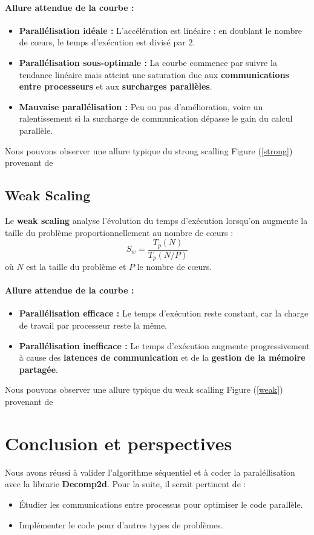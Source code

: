 \documentclass[a4paper,12pt]{article}
\begin{document}
\paragraph{Allure attendue de la courbe :}  
\begin{itemize}
    \item \textbf{Parallélisation idéale :} L’accélération est linéaire : en doublant le nombre de cœurs, le temps d’exécution est divisé par 2.
    \item \textbf{Parallélisation sous-optimale :} La courbe commence par suivre la tendance linéaire mais atteint une saturation due aux \textbf{communications entre processeurs} et aux \textbf{surcharges parallèles}.
    \item \textbf{Mauvaise parallélisation :} Peu ou pas d’amélioration, voire un ralentissement si la surcharge de communication dépasse le gain du calcul parallèle.
\end{itemize}
Nous pouvons observer une allure typique du strong scalling Figure (\ref{strong}) provenant de \cite{scaling-site}


\subsection{Weak Scaling}
Le \textbf{weak scaling} analyse l’évolution du temps d’exécution lorsqu’on augmente la taille du problème proportionnellement au nombre de cœurs :
\begin{equation}
S_w = \frac{T_p(N)}{T_p(N/P)}
\end{equation}
où $N$ est la taille du problème et $P$ le nombre de cœurs.

\paragraph{Allure attendue de la courbe :}  
\begin{itemize}
    \item \textbf{Parallélisation efficace :} Le temps d’exécution reste constant, car la charge de travail par processeur reste la même.
    \item \textbf{Parallélisation inefficace :} Le temps d’exécution augmente progressivement à cause des \textbf{latences de communication} et de la \textbf{gestion de la mémoire partagée}.
\end{itemize}
Nous pouvons observer une allure typique du weak scalling Figure (\ref{weak}) provenant de \cite{scaling-site}

\section{Conclusion et perspectives}
Nous avons réussi à valider l’algorithme séquentiel et à coder la paraléllisation avec la librarie \textbf{Decomp2d}. Pour la suite, il serait pertinent de :
\begin{itemize}
    \item Étudier les communications entre processus pour optimiser le code parallèle.
    \item Implémenter le code pour d'autres types de problèmes.
\end{itemize}
\end{document}

